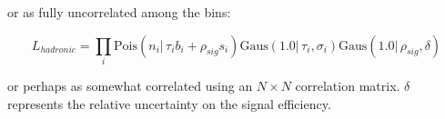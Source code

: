 or as fully uncorrelated among the bins:

\begin{equation}
L_{hadronic}=\prod_i \mathrm{Pois}(n_i |\, \tau_i b_i + \rho_{sig}s_i)\mathrm{Gaus}(1.0 |\,\tau_i, \sigma_i)\mathrm{Gaus}(1.0 |\,\rho_{sig}, \delta)
\end{equation}

or perhaps as somewhat correlated using an $N \times N$ correlation matrix.  $\delta$ represents the relative uncertainty on the signal efficiency.

